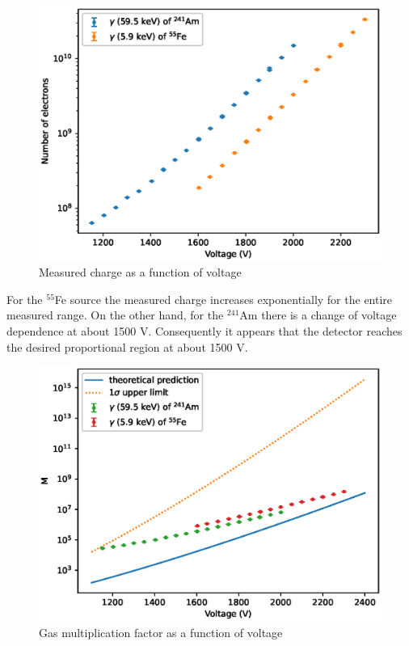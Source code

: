 \documentclass[a4paper]{article}
\begin{document}
\begin{figure}[ht!]
\centering
\includegraphics[width=\textwidth]{fig/python/hv_scans.eps}
\caption{Measured charge as a function of voltage}
\label{fig:hv_scans}
\end{figure}

\FloatBarrier
For the $^{55}$Fe source the measured charge increases exponentially for the entire measured range.
On the other hand, for the $^241$Am there is a change of voltage dependence at about 1500 V.
Consequently it appears that the detector reaches the desired proportional region at about 1500 V.

\begin{figure}[ht!]
\centering
\includegraphics[width=\textwidth]{fig/python/gas_mult.eps}
\caption{Gas multiplication factor as a function of voltage}
\label{fig:gas_mult}
\end{figure}
\end{document}
